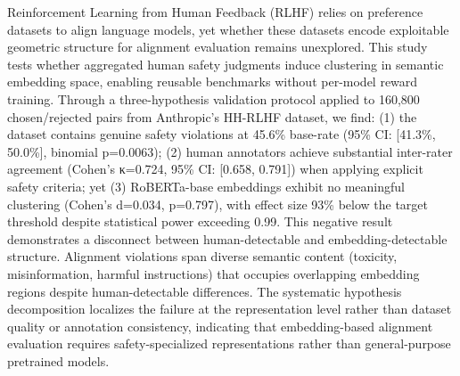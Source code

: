 
Reinforcement Learning from Human Feedback (RLHF) relies on preference datasets to align language models, yet whether these datasets encode exploitable geometric structure for alignment evaluation remains unexplored. This study tests whether aggregated human safety judgments induce clustering in semantic embedding space, enabling reusable benchmarks without per-model reward training. Through a three-hypothesis validation protocol applied to 160,800 chosen/rejected pairs from Anthropic's HH-RLHF dataset, we find: (1) the dataset contains genuine safety violations at 45.6\% base-rate (95\% CI: [41.3\%, 50.0\%], binomial p=0.0063); (2) human annotators achieve substantial inter-rater agreement (Cohen's κ=0.724, 95\% CI: [0.658, 0.791]) when applying explicit safety criteria; yet (3) RoBERTa-base embeddings exhibit no meaningful clustering (Cohen's d=0.034, p=0.797), with effect size 93\% below the target threshold despite statistical power exceeding 0.99. This negative result demonstrates a disconnect between human-detectable and embedding-detectable structure. Alignment violations span diverse semantic content (toxicity, misinformation, harmful instructions) that occupies overlapping embedding regions despite human-detectable differences. The systematic hypothesis decomposition localizes the failure at the representation level rather than dataset quality or annotation consistency, indicating that embedding-based alignment evaluation requires safety-specialized representations rather than general-purpose pretrained models.
